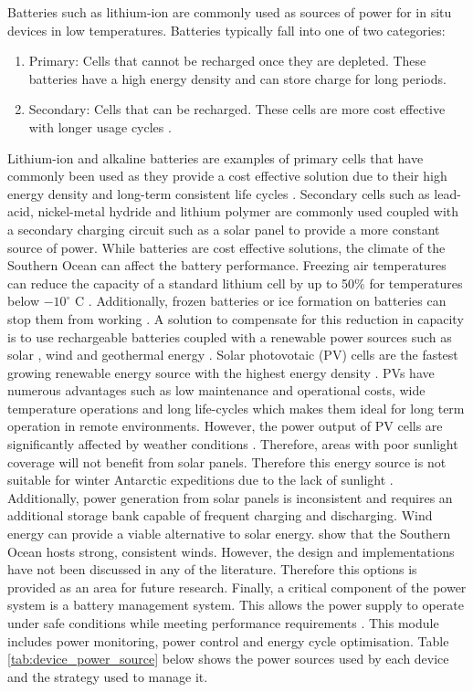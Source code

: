 Batteries such as lithium-ion are commonly used as sources of power for in situ devices in low temperatures. Batteries typically fall into one of two categories:
\begin{enumerate}
	\item Primary: Cells that cannot be recharged once they are depleted. These batteries have a high energy density and can store charge for long periods\cite{besenhard2008handbook}.
	\item Secondary: Cells that can be recharged. These cells are more cost effective with longer usage cycles \cite{besenhard2008handbook}.
\end{enumerate}

Lithium-ion and alkaline batteries are examples of primary cells that have commonly been used as they provide a cost effective solution due to their high energy density and long-term consistent life cycles \cite{zareer2018review}.  Secondary cells such as lead-acid, nickel-metal hydride and lithium polymer are commonly used coupled with a secondary charging circuit such as a solar panel \cite{manimekalai2013overview} to provide a more constant source of power. While batteries are cost effective solutions, the climate of the Southern Ocean can affect the battery performance. Freezing air temperatures can reduce the capacity of a standard lithium cell by up to 50\% for temperatures below $-10^\circ$ C \cite{doble2017robust,ZHANG2003137}. Additionally, frozen batteries or ice formation on batteries can stop them from working \cite{doble2017robust,manimekalai2013overview}. A solution to compensate for this reduction in capacity is to use rechargeable batteries coupled with a renewable power sources such as solar \cite{doble2017robust,rabault2019open}, wind and geothermal energy \cite{manimekalai2013overview}. Solar photovotaic (PV) cells are the fastest growing renewable energy source with the highest energy density \cite{jordehi2016parameter}. PVs have numerous advantages such as low maintenance and operational costs, wide temperature operations and long life-cycles \cite{jordehi2016parameter} which makes them ideal for long term operation in remote environments. However, the power output of PV cells are significantly affected by weather conditions \cite{sharma2015solar}. Therefore, areas with poor sunlight coverage will not benefit from solar panels. Therefore this energy source is not suitable for winter Antarctic expeditions due to the lack of sunlight \cite{lever2006solar}. Additionally, power generation from solar panels is inconsistent and requires an additional storage bank capable of frequent charging and discharging. Wind energy can provide a viable alternative to solar energy. \textcite{vichi2019effects} show that the Southern Ocean hosts strong, consistent winds. However, the design and implementations have not been discussed in any of the literature. Therefore this options is provided as an area for future research. Finally, a critical component of the power system is a battery management system. This allows the power supply to operate under safe conditions while meeting performance requirements \cite{vidal2019xev}. This module includes power monitoring, power control and energy cycle optimisation. Table \ref{tab:device_power_source} below shows the power sources used by each device and the strategy used to manage it.
